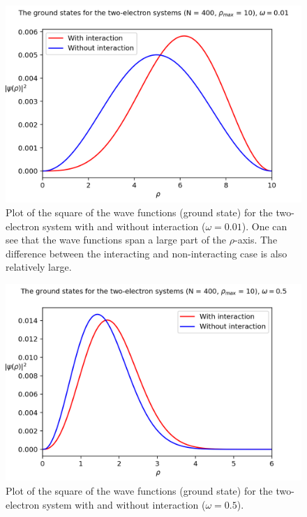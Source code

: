 \documentclass[10pt,a4paper,titlepage]{article}
\begin{document}
\begin{figure}[!h]
\centering
\caption{Plot of the square of the wave functions (ground state) for the two-electron system with and without interaction ($\omega = 0.01$). One can see that the wave functions span a large part of the $\rho$-axis. The difference between the interacting and non-interacting case is also relatively large.}
\label{fig:two_001}
\includegraphics[scale=0.6]{non_vs_int_two_e_001.png}
\end{figure}

\begin{figure}[!h]
\centering
\caption{Plot of the square of the wave functions (ground state) for the two-electron system with and without interaction ($\omega = 0.5$). }
\label{fig:two_05}
\includegraphics[scale=0.6]{non_vs_int_two_e_05.png}
\end{figure}
\end{document}
